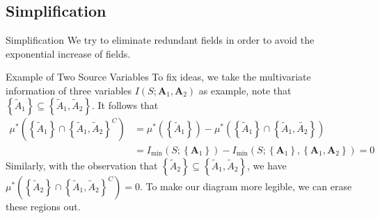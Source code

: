\subsection{Simplification}
\begin{frame}{Simplification}
    We try to eliminate redundant fields in order to avoid the exponential increase of fields.
    
    \begin{block}{Example of Two Source Variables}
        To fix ideas, we take the multivariate information of three variables $I(S;\mathbf{A}_1, \mathbf{A}_2)$ as example, note that $\left\{ \tilde{A}_1 \right\} \subseteq \left\{\tilde{A}_1, \tilde{A}_2 \right\}$. It follows that 
        \begin{equation}
        \begin{aligned}
            \mu^{*}\left( \left\{ \tilde{A}_1 \right\} \cap \left\{\tilde{A}_1, \tilde{A}_2 \right\}^{C} \right) &= \mu^{*}\left( \left\{\tilde{A}_1\right\}\right)  - \mu^{*}\left(\left\{\tilde{A}_1 \right\}\cap  \left\{  \tilde{A}_1, \tilde{A_2} \right \} \right) \\
            &= I_{\min} \left( S; \left\{\mathbf{A}_1 \right\} \right) - I_{\min} \left( S; \left\{ \mathbf{A}_1 \right\} ,\left\{ \mathbf{A}_1, \mathbf{A}_2 \right\} \right) = 0
        \end{aligned}
        \label{eqn:fieldelim}
        \end{equation}
        Similarly, with the observation that $\left\{ \tilde{A}_2 \right\} \subseteq \left\{\tilde{A}_1, \tilde{A}_2 \right\}$, we have $\mu^{*}\left( \left\{ \tilde{A}_2 \right\} \cap \left\{\tilde{A}_1, \tilde{A}_2 \right\}^{C} \right) = 0$. To make our diagram more legible, we can erase these regions out.
    \end{block}
\end{frame}
    
